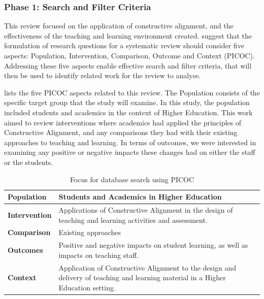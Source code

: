 \subsubsection{Phase 1: Search and Filter Criteria} %
\label{sub:review_questions}

This review focused on the application of constructive alignment, and the effectiveness of the teaching and learning environment created. \citet{Petticrew:2008} suggest that the formulation of research questions for a systematic review should consider five aspects: Population, Intervention, Comparison, Outcome and Context (PICOC). Addressing these five aspects enable effective search and filter criteria, that will then be used to identify related work for the review to analyse.

 lists the five PICOC aspects related to this review. The Population consists of the specific target group that the study will examine. In this study, the population included students and academics in the context of Higher Education. This work aimed to review interventions where academics had applied the principles of Constructive Alignment, and any comparisons they had with their existing approaches to teaching and learning. In terms of outcomes, we were interested in examining any positive or negative impacts these changes had on either the staff or the students.

\begin{table}[t]
	\centering
	\caption{Focus for database search using PICOC}
	\label{tbl:picoc}

    \begin{tabular}{|l|p{9cm}|}
    \hline
    \textbf{Population} & Students and Academics in Higher Education\\ \hline
    \textbf{Intervention} & Applications of Constructive Alignment in the design of teaching and learning activities and assessment. \\ \hline
    \textbf{Comparison} & Existing approaches \\ \hline
    \textbf{Outcomes} & Positive and negative impacts on student learning, as well as impacts on teaching staff. \\ \hline
    \textbf{Context} & Application of Constructive Alignment to the design and delivery of teaching and learning material in a Higher Education setting. \\ \hline
    \end{tabular}
\end{table}


